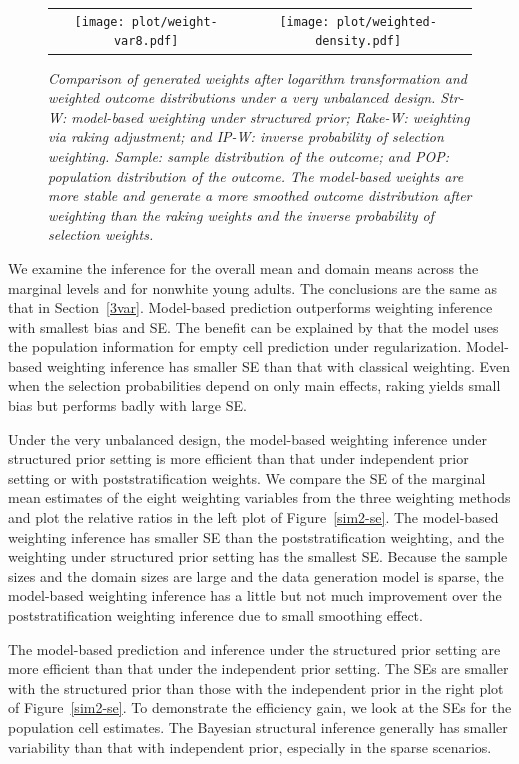 \documentclass[11pt]{article}
\numberwithin{figure}{section}
\numberwithin{table}{section}
\numberwithin{equation}{section}
\begin{document}
\begin{figure} \centering \begin{tabular}{cc}
\texttt{[image: plot/weight-var8.pdf]}&\texttt{[image: plot/weighted-density.pdf]}
\end{tabular} \caption{\em Comparison of generated weights after logarithm
transformation and weighted outcome distributions under a very unbalanced
design. Str-W: model-based weighting under structured prior; Rake-W: weighting
via raking adjustment; and IP-W: inverse probability of selection weighting.
Sample: sample distribution of the outcome; and POP: population distribution of
the outcome. The model-based weights are more stable and generate a more
smoothed outcome distribution after weighting than the raking weights and the
inverse probability of selection weights.} \label{sim2-weight} \end{figure} 


We examine the inference for the overall mean and domain means across the
marginal levels and for nonwhite young adults. The conclusions are the same as
that in Section~\ref{3var}. Model-based prediction outperforms weighting
inference with smallest bias and SE. The benefit can be explained by that the
model uses the population information for empty cell prediction under
regularization. Model-based weighting inference has smaller SE than that with
classical weighting. Even when the selection probabilities depend on only main
effects, raking yields small bias but performs badly with large SE. 

Under the very unbalanced design, the model-based weighting inference under
structured prior setting is more efficient than that under independent prior
setting or with poststratification weights. We compare the SE of the marginal
mean estimates of the eight weighting variables from the three weighting
methods and plot the relative ratios in the left plot of Figure~\ref{sim2-se}.
The model-based weighting inference has smaller SE than the poststratification
weighting, and the weighting under structured prior setting has the smallest
SE. Because the sample sizes and the domain sizes are large and the data
generation model is sparse, the model-based weighting inference has a little
but not much improvement over the poststratification weighting inference due to
small smoothing effect. 

The model-based prediction and inference under the structured prior setting are
more efficient than that under the independent prior setting. The SEs are
smaller with the structured prior than those with the independent prior in the
right plot of Figure~\ref{sim2-se}. To  demonstrate the efficiency gain, we
look at the SEs for the population cell estimates. The Bayesian structural
inference generally has smaller variability than that with independent prior,
especially in the sparse scenarios.
  
\end{document}
